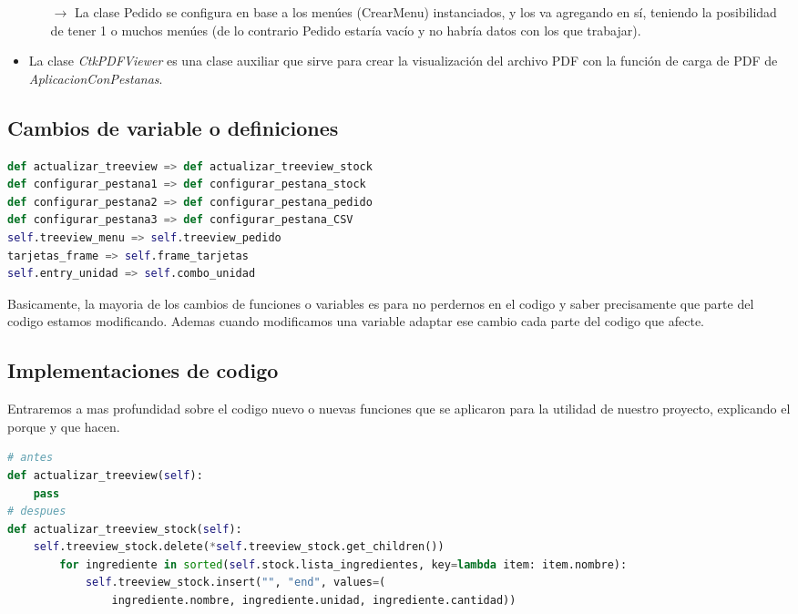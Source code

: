 \documentclass[a4paper,12pt]{article}
\begin{document}
\begin{itemize}
\begin{itemize}
            \item[$\rightarrow$] La clase Pedido se configura en base a los menúes (CrearMenu) instanciados, y los va agregando en sí, teniendo la posibilidad de tener 1 o muchos menúes (de lo contrario Pedido estaría vacío y no habría datos con los que trabajar).
        \end{itemize}
    \item La clase \textit{CtkPDFViewer} es una clase auxiliar que sirve para crear la visualización del archivo PDF con la función de carga de PDF de \textit{AplicacionConPestanas}.
\end{itemize}

\subsection{Cambios de variable o definiciones}

\begin{lstlisting}[language=Python, caption={Cambios de definiciones o variables}, frame=single]
def actualizar_treeview => def actualizar_treeview_stock
def configurar_pestana1 => def configurar_pestana_stock
def configurar_pestana2 => def configurar_pestana_pedido
def configurar_pestana3 => def configurar_pestana_CSV
self.treeview_menu => self.treeview_pedido
tarjetas_frame => self.frame_tarjetas
self.entry_unidad => self.combo_unidad
\end{lstlisting}

Basicamente, la mayoria de los cambios de funciones o variables es para no perdernos en el codigo y saber precisamente que parte del codigo estamos modificando. Ademas cuando modificamos una variable adaptar ese cambio cada parte del codigo que afecte.

\subsection{Implementaciones de codigo}

Entraremos a mas profundidad sobre el codigo nuevo o nuevas funciones que se aplicaron para la utilidad de nuestro proyecto, explicando el porque y que hacen.

\begin{lstlisting}[language=Python, caption={Implementaciones de codigo}, frame=single]
# antes
def actualizar_treeview(self):
    pass
# despues
def actualizar_treeview_stock(self):
    self.treeview_stock.delete(*self.treeview_stock.get_children())
        for ingrediente in sorted(self.stock.lista_ingredientes, key=lambda item: item.nombre):
            self.treeview_stock.insert("", "end", values=(
                ingrediente.nombre, ingrediente.unidad, ingrediente.cantidad))
\end{lstlisting}
\end{document}
